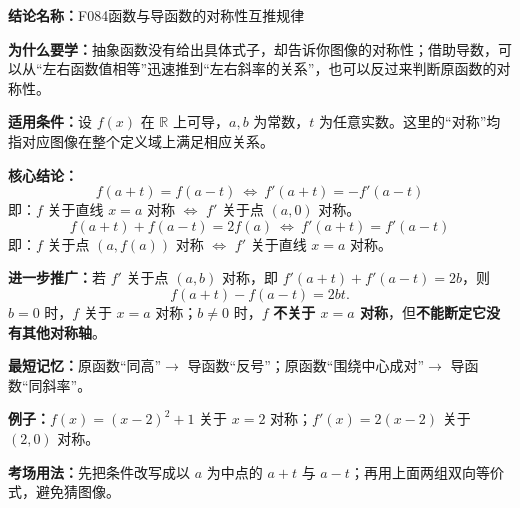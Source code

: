 \textbf{结论名称：}F084\quad 函数与导函数的对称性互推规律

\textbf{为什么要学：}抽象函数没有给出具体式子，却告诉你图像的对称性；借助导数，可以从“左右函数值相等”迅速推到“左右斜率的关系”，也可以反过来判断原函数的对称性。

\textbf{适用条件：}设 $f(x)$ 在 $\mathbb R$ 上可导，$a,b$ 为常数，$t$ 为任意实数。这里的“对称”均指对应图像在整个定义域上满足相应关系。

\textbf{核心结论：}
\[
\boxed{f(a+t)=f(a-t)\ \Longleftrightarrow\ f'(a+t)=-f'(a-t)}
\]
即：$f$ 关于直线 $x=a$ 对称 $\Longleftrightarrow$ $f'$ 关于点 $(a,0)$ 对称。
\[
\boxed{f(a+t)+f(a-t)=2f(a)\ \Longleftrightarrow\ f'(a+t)=f'(a-t)}
\]
即：$f$ 关于点 $(a,f(a))$ 对称 $\Longleftrightarrow$ $f'$ 关于直线 $x=a$ 对称。

\textbf{进一步推广：}若 $f'$ 关于点 $(a,b)$ 对称，即 $f'(a+t)+f'(a-t)=2b$，则
\[
\boxed{f(a+t)-f(a-t)=2bt.}
\]
$b=0$ 时，$f$ 关于 $x=a$ 对称；$b\ne0$ 时，$f$ \textbf{不关于 $x=a$ 对称}，但\textbf{不能断定它没有其他对称轴}。

\textbf{最短记忆：}原函数“同高”$\to$ 导函数“反号”；原函数“围绕中心成对”$\to$ 导函数“同斜率”。

\textbf{例子：}$f(x)=(x-2)^2+1$ 关于 $x=2$ 对称；$f'(x)=2(x-2)$ 关于 $(2,0)$ 对称。

\textbf{考场用法：}先把条件改写成以 $a$ 为中点的 $a+t$ 与 $a-t$；再用上面两组双向等价式，避免猜图像。
